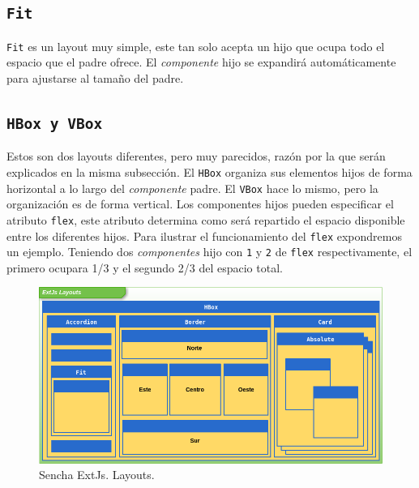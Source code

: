 	\subsection{\texttt{Fit}}
		\texttt{Fit} es un layout muy simple, este tan solo acepta un hijo que ocupa todo el espacio que el padre ofrece. El \emph{componente}
		hijo se expandirá automáticamente para ajustarse al tamaño del padre.
	\subsection{\texttt{HBox y VBox}}
		Estos son dos layouts diferentes, pero muy parecidos, razón por la que serán explicados en la misma subsección. El \texttt{HBox}
		organiza sus elementos hijos de forma horizontal a lo largo del \emph{componente} padre. El \texttt{VBox} hace lo mismo, pero la
		organización es de forma vertical. Los componentes hijos pueden especificar el atributo \texttt{flex}, este atributo determina como
		será repartido el espacio disponible entre los diferentes hijos. Para ilustrar el funcionamiento del \texttt{flex} expondremos un
		ejemplo. Teniendo dos \emph{componentes} hijo con \texttt{1} y \texttt{2} de \texttt{flex} respectivamente, el primero ocupara 1/3 y el
		segundo 2/3 del espacio total.
	\begin{figure}[h]
		\centering
		\includegraphics[keepaspectratio, width=1\textwidth]{./img/layouts.png}
		\caption{Sencha ExtJs. Layouts.}   
		\label{fig:layouts}
	\end{figure}

